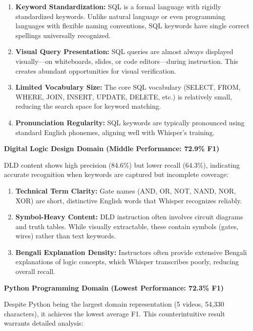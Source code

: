\begin{enumerate}
    \item \textbf{Keyword Standardization:} SQL is a formal language with rigidly standardized keywords. Unlike natural language or even programming languages with flexible naming conventions, SQL keywords have single correct spellings universally recognized.
    
    \item \textbf{Visual Query Presentation:} SQL queries are almost always displayed visually---on whiteboards, slides, or code editors---during instruction. This creates abundant opportunities for visual verification.
    
    \item \textbf{Limited Vocabulary Size:} The core SQL vocabulary (SELECT, FROM, WHERE, JOIN, INSERT, UPDATE, DELETE, etc.) is relatively small, reducing the search space for keyword matching.
    
    \item \textbf{Pronunciation Regularity:} SQL keywords are typically pronounced using standard English phonemes, aligning well with Whisper's training.
\end{enumerate}

\textbf{Digital Logic Design Domain (Middle Performance: 72.9\% F1)}

DLD content shows high precision (84.6\%) but lower recall (64.3\%), indicating accurate recognition when keywords are captured but incomplete coverage:

\begin{enumerate}
    \item \textbf{Technical Term Clarity:} Gate names (AND, OR, NOT, NAND, NOR, XOR) are short, distinctive English words that Whisper recognizes reliably.
    
    \item \textbf{Symbol-Heavy Content:} DLD instruction often involves circuit diagrams and truth tables. While visually extractable, these contain symbols (gates, wires) rather than text keywords.
    
    \item \textbf{Bengali Explanation Density:} Instructors often provide extensive Bengali explanations of logic concepts, which Whisper transcribes poorly, reducing overall recall.
\end{enumerate}

\textbf{Python Programming Domain (Lowest Performance: 72.3\% F1)}

Despite Python being the largest domain representation (5 videos, 54,330 characters), it achieves the lowest average F1. This counterintuitive result warrants detailed analysis:

